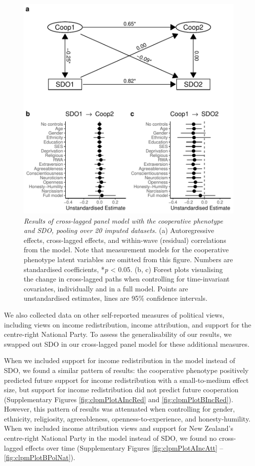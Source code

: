 \documentclass[
  man,floatsintext]{apa6}
\begin{document}
\begin{figure}
\centering
\includegraphics{manuscript_files/figure-latex/clpmPlotASDO-1.pdf}
\caption{\label{fig:clpmPlotASDO}\emph{Results of cross-lagged panel model with the
cooperative phenotype and SDO, pooling over 20 imputed datasets.} (a)
Autoregressive effects, cross-lagged effects, and within-wave (residual)
correlations from the model. Note that measurement models for the cooperative
phenotype latent variables are omitted from this figure. Numbers are
standardised coefficients, *\emph{p} \textless{} 0.05. (b, c) Forest plots visualising the
change in cross-lagged paths when controlling for time-invariant covariates,
individually and in a full model. Points are unstandardised estimates, lines
are 95\% confidence intervals.}
\end{figure}

We also collected data on other self-reported measures of political views,
including views on income redistribution, income attribution, and support for
the centre-right National Party. To assess the generalisability of our results,
we swapped out SDO in our cross-lagged panel model for these additional
measures.

When we included support for income redistribution in the model instead of SDO,
we found a similar pattern of results: the cooperative phenotype positively
predicted future support for income redistribution with a small-to-medium effect
size, but support for income redistribution did not predict future cooperation
(Supplementary Figures \ref{fig:clpmPlotAIncRed} and \ref{fig:clpmPlotBIncRed}).
However, this pattern of results was attenuated when controlling for gender,
ethnicity, religiosity, agreeableness, openness-to-experience, and
honesty-humility. When we included income attribution views and support for New
Zealand's centre-right National Party in the model instead of SDO, we found no
cross-lagged effects over time (Supplementary Figures \ref{fig:clpmPlotAIncAtt}
-- \ref{fig:clpmPlotBPolNat}).
\end{document}
